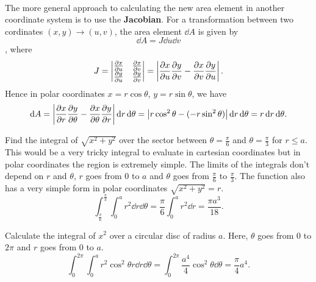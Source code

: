\documentclass[../multivariate_calculus.tex]{subfiles}
\begin{document}
        \paragraph{}
        The more general approach to calculating the new area element in another coordinate system is to use the \textbf{Jacobian}.
        For a transformation between two cordinates $(x,y)\to(u,v)$, the area element $\dd{A}$ is given by
        \begin{equation}
            \dd{A}=J\dd{u}\dd{v}
        \end{equation},
        where
        \begin{equation}
            J=\begin{vmatrix}
                \pdv{x}{u} & \pdv{x}{v} \\
                \pdv{y}{u} & \pdv{y}{v}
            \end{vmatrix}=\left|\pdv{x}{u}\pdv{y}{v}-\pdv{x}{v}\pdv{y}{u}\right|.
        \end{equation}
        Hence in polar coordinates $x=r\cos\theta$, $y=r\sin\theta$, we have
        \begin{equation}
            \dd{A}=\left|\pdv{x}{r}\pdv{y}{\theta}-\pdv{x}{\theta}\pdv{y}{r}\right|\dd{r}\dd{\theta}=\left|r\cos^2\theta-(-r\sin^2\theta)\right|\dd{r}\dd{\theta}=r\dd{r}\dd{\theta}.
        \end{equation}
        \begin{example}
            Find the integral of $\sqrt{x^2+y^2}$ over the sector between $\theta=\frac{\pi}{6}$ and $\theta=\frac{\pi}{3}$ for $r\leq a$.
            This would be a very tricky integral to evaluate in cartesian coordinates but in polar coordinates the region is extremely simple.
            The limits of the integrals don't depend on $r$ and $\theta$, $r$ goes from 0 to $a$ and $\theta$ goes from $\frac{\pi}{6}$ to $\frac{\pi}{3}$.
            The function also has a very simple form in polar coordinates $\sqrt{x^2+y^2}=r$.
            \begin{equation}
                \int_\frac{\pi}{6}^\frac{\pi}{3}\int_0^a r^2\dd{r}\dd{\theta}=\frac{\pi}{6}\int_0^a r^2\dd{r}=\frac{\pi a^3}{18}.
            \end{equation}
        \end{example}
        \begin{example}
            Calculate the integral of $x^2$ over a circular disc of radius $a$.
            Here, $\theta$ goes from 0 to $2\pi$ and $r$ goes from 0 to $a$.
            \begin{equation}
                \int_0^{2\pi}\int_0^a r^2\cos^2\theta r\dd{r}\dd{\theta}=\int_0^{2\pi}\frac{a^4}{4}\cos^2\theta\dd{\theta}=\frac{\pi}{4}a^4.
            \end{equation}
        \end{example}
\end{document}
